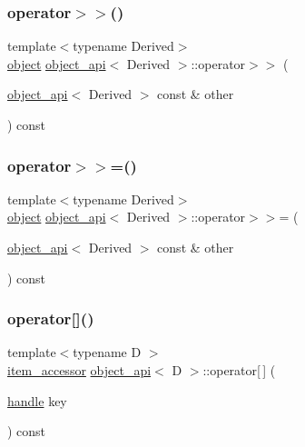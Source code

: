 \subsubsection{\texorpdfstring{operator$>$$>$()}{operator>>()}}
{\footnotesize\ttfamily template$<$typename Derived$>$ \\
\mbox{\hyperlink{classobject}{object}} \mbox{\hyperlink{classobject__api}{object\+\_\+api}}$<$ Derived $>$\+::operator$>$$>$ (\begin{DoxyParamCaption}\item[{\mbox{\hyperlink{classobject__api}{object\+\_\+api}}$<$ Derived $>$ const \&}]{other }\end{DoxyParamCaption}) const}

\mbox{\label{classobject__api_abcee9a0ac25d249d8ae6d17a5747ee2f}} 
\subsubsection{\texorpdfstring{operator$>$$>$=()}{operator>>=()}}
{\footnotesize\ttfamily template$<$typename Derived$>$ \\
\mbox{\hyperlink{classobject}{object}} \mbox{\hyperlink{classobject__api}{object\+\_\+api}}$<$ Derived $>$\+::operator$>$$>$= (\begin{DoxyParamCaption}\item[{\mbox{\hyperlink{classobject__api}{object\+\_\+api}}$<$ Derived $>$ const \&}]{other }\end{DoxyParamCaption}) const}

\mbox{\label{classobject__api_a22a02d920a489c385a2502802e547943}} 
\subsubsection{\texorpdfstring{operator[]()}{operator[]()}\hspace{0.1cm}{\footnotesize\ttfamily [1/2]}}
{\footnotesize\ttfamily template$<$typename D $>$ \\
\mbox{\hyperlink{pytypes_8h_a9907d3edf962653e33d36bccc8b8a268}{item\+\_\+accessor}} \mbox{\hyperlink{classobject__api}{object\+\_\+api}}$<$ D $>$\+::operator\mbox{[}$\,$\mbox{]} (\begin{DoxyParamCaption}\item[{\mbox{\hyperlink{classhandle}{handle}}}]{key }\end{DoxyParamCaption}) const}

